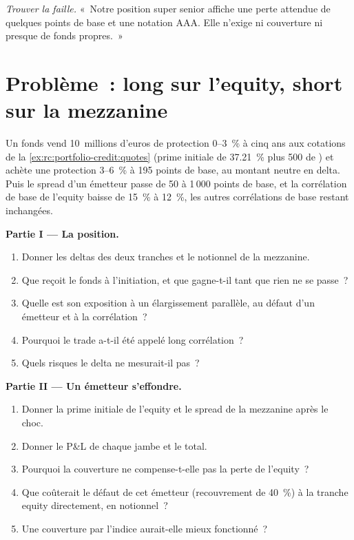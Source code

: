 \begin{exercise}[$\star\star\star$]\label{exo:rc:portfolio-credit:8}
\emph{Trouver la faille.} «~Notre position super senior affiche une perte attendue de quelques points de base
et une notation AAA. Elle n'exige ni couverture ni presque de fonds propres.~»
\end{exercise}

\section{Problème~: long sur l'equity, short sur la mezzanine}

\begin{problem}\label{pb:rc:portfolio-credit:1}
Un fonds vend 10~millions d'euros de protection 0--3~\% à cinq ans aux cotations de la
\cref{ex:rc:portfolio-credit:quotes} (prime initiale de 37.21~\% plus 500 de ) et achète une protection 3--6~\%
à 195 points de base, au montant neutre en delta. Puis le spread d'un émetteur passe
de 50 à 1\,000 points de base, et la corrélation de base de l'equity baisse de 15~\% à 12~\%,
les autres corrélations de base restant inchangées.

\medskip\noindent\textbf{Partie I --- La position.}
\begin{enumerate}
\item Donner les deltas des deux tranches et le notionnel de la mezzanine.
\item Que reçoit le fonds à l'initiation, et que gagne-t-il tant que rien
ne se passe~?
\item Quelle est son exposition à un élargissement parallèle, au défaut d'un émetteur
et à la corrélation~?
\item Pourquoi le trade a-t-il été appelé long corrélation~?
\item Quels risques le delta ne mesurait-il pas~?
\end{enumerate}

\medskip\noindent\textbf{Partie II --- Un émetteur s'effondre.}
\begin{enumerate}[resume]
\item Donner la prime initiale de l'equity et le spread de la mezzanine après le choc.
\item Donner le P\&L de chaque jambe et le total.
\item Pourquoi la couverture ne compense-t-elle pas la perte de l'equity~?
\item Que coûterait le défaut de cet émetteur (recouvrement de 40~\%) à la tranche
equity directement, en notionnel~?
\item Une couverture par l'indice aurait-elle mieux fonctionné~?
\end{enumerate}


\end{problem}
